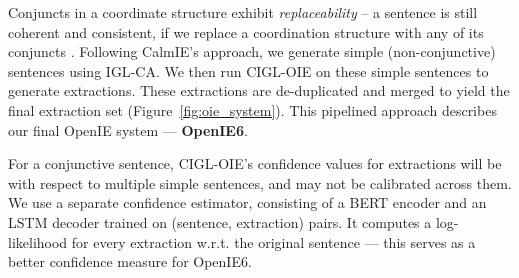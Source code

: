 \documentclass[11pt,a4paper]{article}
\newcommand{\shortname}{{\scshape IGL}}
\begin{document}
\vspace{0.5ex}
Conjuncts in a coordinate structure exhibit \emph{replaceability} -- a sentence is still coherent and consistent, if we replace a coordination structure with any of its conjuncts \cite{ficler&goldberg16b}. Following CalmIE's approach, we generate simple (non-conjunctive) sentences using \shortname-CA. We then run C\shortname-OIE on these simple sentences to generate extractions. These extractions are de-duplicated and merged to yield the final extraction set (Figure~\ref{fig:oie_system}).
This pipelined approach describes our final OpenIE system --- \textbf{OpenIE6}.





For a conjunctive sentence, C\shortname-OIE's confidence values for extractions will be with respect to multiple simple sentences, and may not be calibrated across them. We use a separate confidence estimator, consisting of a BERT encoder and an LSTM decoder trained on (sentence, extraction) pairs. It computes a log-likelihood for every extraction w.r.t. the original sentence --- this serves as a better confidence measure for OpenIE6.




























 
\end{document}
